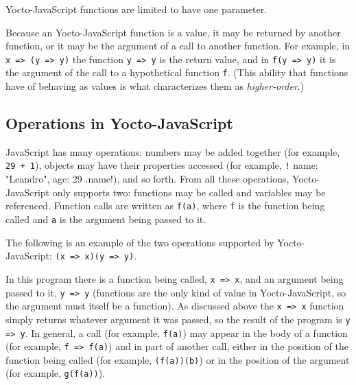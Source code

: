 \documentclass[12pt, oneside]{book}
\begin{document}
Yocto-JavaScript functions are limited to have one parameter.

Because an Yocto-JavaScript function is a value, it may be returned by another function, or it may be the argument of a call to another function. For example, in \texttt{x => (y => y)} the function \texttt{y => y} is the return value, and in \texttt{f(y => y)} it is the argument of the call to a hypothetical function \texttt{f}. (This ability that functions have of behaving as values is what characterizes them as \emph{higher-order}.)

\subsection{Operations in Yocto-JavaScript}

JavaScript has many operations: numbers may be added together (for example, \texttt{29 + 1}), objects may have their properties accessed (for example, \texttt!{ name: "Leandro", age: 29 }.name!), and so forth. From all these operations, Yocto-JavaScript only supports two: functions may be called and variables may be referenced. Function calls are written as \texttt{f(a)}, where \texttt{f} is the function being called and \texttt{a} is the argument being passed to it.

The following is an example of the two operations supported by Yocto-JavaScript: \texttt{(x => x)(y => y)}.

In this program there is a function being called, \texttt{x => x}, and an argument being passed to it, \texttt{y => y} (functions are the only kind of value in Yocto-JavaScript, so the argument must itself be a function). As discussed above the \texttt{x => x} function simply returns whatever argument it was passed, so the result of the program is \texttt{y => y}. In general, a call (for example, \texttt{f(a)}) may appear in the body of a function (for example, \texttt{f => f(a)}) and in part of another call, either in the position of the function being called (for example, \texttt{(f(a))(b)}) or in the position of the argument (for example, \texttt{g(f(a))}).
\end{document}
